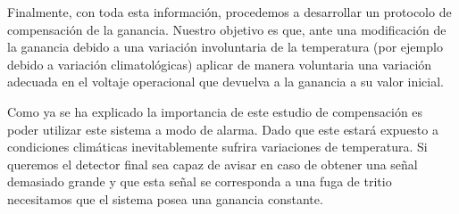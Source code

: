 Finalmente, con toda esta información, procedemos a desarrollar un protocolo de compensación de la ganancia. Nuestro objetivo es que, ante una modificación de la ganancia debido a una variación involuntaria de la temperatura (por ejemplo debido a variación climatológicas) aplicar de manera voluntaria una variación adecuada en el voltaje operacional que devuelva a la ganancia a su valor inicial.

Como ya se ha explicado la importancia de este estudio de compensación es poder utilizar este sistema a modo de alarma. Dado que este estará expuesto a condiciones climáticas inevitablemente sufrira variaciones de temperatura. Si queremos el detector final sea capaz de avisar en caso de obtener una señal demasiado grande y que esta señal se corresponda a una fuga de tritio necesitamos que el sistema posea una ganancia constante.


